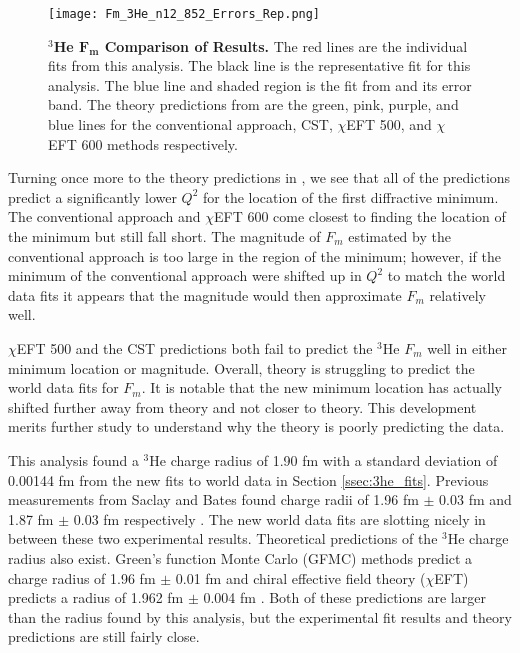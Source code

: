 \begin{figure}[!ht]
	\begin{center}
	\texttt{[image: Fm\_3He\_n12\_852\_Errors\_Rep.png]}
	\end{center}
	\caption[$^3$He $F_m$ Comparison of Results]{
	{\bf{$^3$He $\boldsymbol{F_m}$ Comparison of Results.}} The red lines are the individual fits from this analysis. The black line is the representative fit for this analysis. The blue line and shaded region is the fit from \cite{Article:Amroun} and its error band. The theory predictions from \cite{Article:Marcucci} are the green, pink, purple, and blue lines for the conventional approach, CST, $\chi$EFT 500, and $\chi$EFT 600 methods respectively.}
	\label{fig:3he_fm_theory}
\end{figure}

Turning once more to the theory predictions in \cite{Article:Marcucci}, we see that all of the predictions predict a significantly lower $Q^2$ for the location of the first diffractive minimum. The conventional approach and $\chi$EFT 600 come closest to finding the location of the minimum but still fall short. The magnitude of $F_m$ estimated by the conventional approach is too large in the region of the minimum; however, if the minimum of the conventional approach were shifted up in $Q^2$ to match the world data fits it appears that the magnitude would then approximate $F_m$ relatively well. 

$\chi$EFT 500 and the CST predictions both fail to predict the $^3$He $F_m$ well in either minimum location or magnitude. Overall, theory is struggling to predict the world data fits for $F_m$. It is notable that the new minimum location has actually shifted further away from theory and not closer to theory. This development merits further study to understand why the theory is poorly predicting the data. 

This analysis found a $^3$He charge radius of 1.90 fm with a standard deviation of 0.00144 fm from the new fits to world data in Section \ref{ssec:3he_fits}. Previous measurements from Saclay and Bates found charge radii of 1.96 fm $\pm$ 0.03 fm and 1.87 fm $\pm$ 0.03 fm respectively \cite{3h_proposal}. The new world data fits are slotting nicely in between these two experimental results. Theoretical predictions of the $^3$He charge radius also exist. Green's function Monte Carlo (GFMC) methods predict a charge radius of 1.96 fm $\pm$ 0.01 fm and chiral effective field theory ($\chi$EFT) predicts a radius of 1.962 fm $\pm$ 0.004 fm \cite{3h_proposal}. Both of these predictions are larger than the radius found by this analysis, but the experimental fit results and theory predictions are still fairly close.

